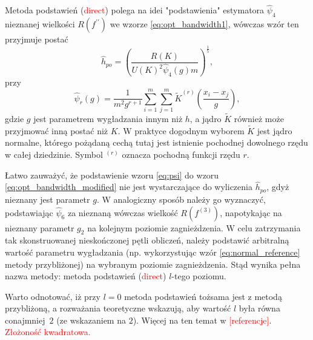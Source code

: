 \documentclass[12pt,a4paper,oneside]{book}
\theoremstyle{definition}
\begin{document}
Metoda podstawień (\textcolor{red}{direct}) polega na idei "podstawienia" estymatora $\hat{\psi}_4$ nieznanej wielkości $R(f^{\prime\prime})$ we wzorze \eqref{eq:opt_bandwidth1}, wówczas wzór ten przyjmuje postać
\begin{equation} \label{eq:opt_bandwidth_modified}
\hat{h}_{po} = \left( \frac{R(K)}{U(K)^2 \hat{\psi}_4(g) m} \right)^\frac{1}{5},
\end{equation}
przy
\begin{equation} \label{eq:psi}
\hat{\psi}_r(g) = \frac{1}{m^2 g^{r+1}} \sum_{i=1}^m \sum_{j=1}^m \tilde K^{(r)} \left( \frac{x_i - x_j}{g} \right),
\end{equation}
gdzie $g$ jest parametrem wygładzania innym niż $h$, a jądro $\tilde K$ również może przyjmować inną postać niż $K$. W praktyce dogodnym wyborem $\tilde K$ jest jądro normalne, którego pożądaną cechą tutaj jest istnienie pochodnej dowolnego rzędu w całej dziedzinie. Symbol $^{(r)}$ oznacza pochodną funkcji rzędu $r$.

Łatwo zauważyć, że podstawienie wzoru \eqref{eq:psi} do wzoru \eqref{eq:opt_bandwidth_modified} nie jest wystarczające do wyliczenia $\hat{h}_{po}$, gdyż nieznany jest parametr $g$. W analogiczny sposób należy go wyznaczyć, podstawiając $\hat{\psi}_6$ za nieznaną wówczas wielkość $R(f^{(3)})$, napotykając na nieznany parametr $g_2$ na kolejnym poziomie zagnieżdzenia. W celu zatrzymania tak skonstruowanej nieskończonej pętli obliczeń, należy podstawić arbitralną wartość parametru wygładzania (np. wykorzystując wzór \eqref{eq:normal_reference} metody przybliżonej) na wybranym poziomie zagnieżdzenia. Stąd wynika pełna nazwa metody: metoda podstawień  (\textcolor{red}{direct}) $l$-tego poziomu.

Warto odnotować, iż przy $l=0$ metoda podstawień tożsama jest z metodą przybliżoną, a rozważania teoretyczne wskazują, aby wartość $l$ była równa conajmniej~$2$ (ze wskazaniem na $2$). Więcej na ten temat w \textcolor{red}{[referencje]}. \textcolor{red}{Złożoność kwadratowa.}
\end{document}
